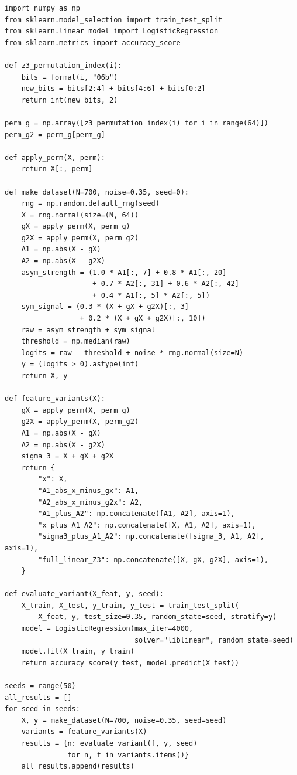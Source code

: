 \documentclass[11pt,a4paper]{report}
\begin{document}
\label{app:ch3-lst11}
\begin{lstlisting}[caption=SBOHN Experiment 6: full $\mathbb{Z}_3$ group]
import numpy as np
from sklearn.model_selection import train_test_split
from sklearn.linear_model import LogisticRegression
from sklearn.metrics import accuracy_score

def z3_permutation_index(i):
    bits = format(i, "06b")
    new_bits = bits[2:4] + bits[4:6] + bits[0:2]
    return int(new_bits, 2)

perm_g = np.array([z3_permutation_index(i) for i in range(64)])
perm_g2 = perm_g[perm_g]

def apply_perm(X, perm):
    return X[:, perm]

def make_dataset(N=700, noise=0.35, seed=0):
    rng = np.random.default_rng(seed)
    X = rng.normal(size=(N, 64))
    gX = apply_perm(X, perm_g)
    g2X = apply_perm(X, perm_g2)
    A1 = np.abs(X - gX)
    A2 = np.abs(X - g2X)
    asym_strength = (1.0 * A1[:, 7] + 0.8 * A1[:, 20]
                     + 0.7 * A2[:, 31] + 0.6 * A2[:, 42]
                     + 0.4 * A1[:, 5] * A2[:, 5])
    sym_signal = (0.3 * (X + gX + g2X)[:, 3]
                  + 0.2 * (X + gX + g2X)[:, 10])
    raw = asym_strength + sym_signal
    threshold = np.median(raw)
    logits = raw - threshold + noise * rng.normal(size=N)
    y = (logits > 0).astype(int)
    return X, y

def feature_variants(X):
    gX = apply_perm(X, perm_g)
    g2X = apply_perm(X, perm_g2)
    A1 = np.abs(X - gX)
    A2 = np.abs(X - g2X)
    sigma_3 = X + gX + g2X
    return {
        "x": X,
        "A1_abs_x_minus_gx": A1,
        "A2_abs_x_minus_g2x": A2,
        "A1_plus_A2": np.concatenate([A1, A2], axis=1),
        "x_plus_A1_A2": np.concatenate([X, A1, A2], axis=1),
        "sigma3_plus_A1_A2": np.concatenate([sigma_3, A1, A2], axis=1),
        "full_linear_Z3": np.concatenate([X, gX, g2X], axis=1),
    }

def evaluate_variant(X_feat, y, seed):
    X_train, X_test, y_train, y_test = train_test_split(
        X_feat, y, test_size=0.35, random_state=seed, stratify=y)
    model = LogisticRegression(max_iter=4000,
                               solver="liblinear", random_state=seed)
    model.fit(X_train, y_train)
    return accuracy_score(y_test, model.predict(X_test))

seeds = range(50)
all_results = []
for seed in seeds:
    X, y = make_dataset(N=700, noise=0.35, seed=seed)
    variants = feature_variants(X)
    results = {n: evaluate_variant(f, y, seed)
               for n, f in variants.items()}
    all_results.append(results)


\end{lstlisting}
\end{document}
